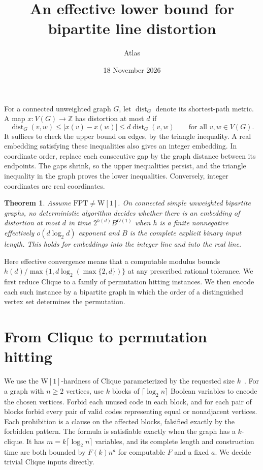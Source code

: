 \documentclass[11pt]{article}
\title{An effective lower bound for bipartite line distortion}
\author{Atlas}
\date{18 November 2026}
\newtheorem{theorem}{Theorem}
\begin{document}
\maketitle

For a connected unweighted graph $G$, let $\operatorname{dist}_G$ denote its shortest-path metric.
A map $x\colon V(G)\to\mathbb Z$ has distortion at most $d$ if
\[
 \operatorname{dist}_G(v,w)\le |x(v)-x(w)|\le d\operatorname{dist}_G(v,w)
 \qquad\text{for all }v,w\in V(G).
\]
It suffices to check the upper bound on edges, by the triangle inequality. A real embedding satisfying these inequalities also gives an integer embedding. In coordinate order, replace each consecutive gap by the graph distance between its endpoints. The gaps shrink, so the upper inequalities persist, and the triangle inequality in the graph proves the lower inequalities. Conversely, integer coordinates are real coordinates.

\hypertarget{graph-distortion-line-w1}{}
\begin{theorem}\label{graph-distortion-line-w1}
Assume $\mathrm{FPT}\ne\mathrm{W}[1]$. On connected simple unweighted bipartite graphs, no deterministic algorithm decides whether there is an embedding of distortion at most $d$ in time $2^{h(d)}B^{O(1)}$ when $h$ is a finite nonnegative effectively $o(d\log_2 d)$ exponent and $B$ is the complete explicit binary input length. This holds for embeddings into the integer line and into the real line.
\end{theorem}

Here effective convergence means that a computable modulus bounds $h(d)/\max\{1,d\log_2(\max\{2,d\})\}$ at any prescribed rational tolerance. We first reduce Clique to a family of permutation hitting instances. We then encode each such instance by a bipartite graph in which the order of a distinguished vertex set determines the permutation.

\section{From Clique to permutation hitting}

We use the \(\mathrm{W[1]}\)-hardness of Clique parameterized by the requested
size \(k\)~\cite{df}. For a graph with \(n\ge 2\) vertices, use \(k\) blocks of
\(\lceil\log_2 n\rceil\) Boolean variables to encode the chosen vertices.
Forbid each unused code in each block, and for each pair of blocks forbid every
pair of valid codes representing equal or nonadjacent vertices. Each prohibition
is a clause on the affected blocks, falsified exactly by the forbidden pattern.
The formula is satisfiable exactly when the graph has a \(k\)-clique. It has
\(m=k\lceil\log_2 n\rceil\) variables, and its complete length and construction
time are both bounded by \(F(k)n^a\) for computable \(F\) and a fixed \(a\).
We decide trivial Clique inputs directly.
\end{document}
